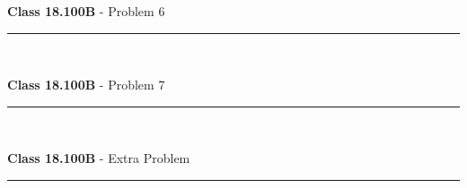 \documentclass[11pt,reqno]{article}
\begin{document}
\vspace{15pt}
\begin{flushleft} 
\textbf{Class 18.100B} - Problem 6\\
\rule{500pt}{1pt}\\
\end{flushleft} 


\vspace{15pt}
\begin{flushleft} 
\textbf{Class 18.100B} - Problem 7\\
\rule{500pt}{1pt}\\
\end{flushleft} 


\vspace{15pt}
\begin{flushleft} 
\textbf{Class 18.100B} - Extra Problem \\
\rule{500pt}{1pt}\\
\end{flushleft} 
\end{document}
